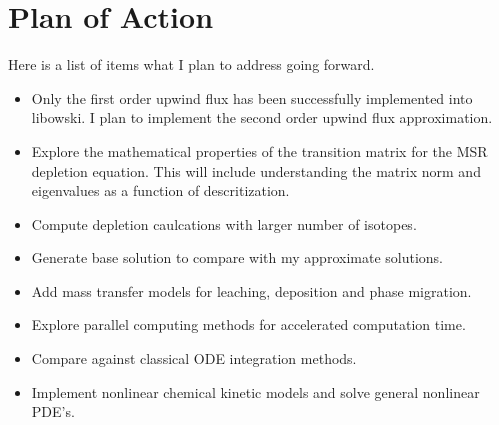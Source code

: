 \chapter{Plan of Action} \label{ch:planOfAction}

Here is a list of items what I plan to address going forward.

\begin{itemize}
    \item Only the first order upwind flux has been successfully implemented into libowski. I plan to implement the second order upwind flux approximation.
    \item Explore the mathematical properties of the transition matrix for the MSR depletion equation. This will include understanding the matrix norm and eigenvalues as a function of descritization. 
    \item Compute depletion caulcations with larger number of isotopes. 
    \item Generate base solution to compare with my approximate solutions.
    \item Add mass transfer models for leaching, deposition and phase migration.
    \item Explore parallel computing methods for accelerated computation time.
    \item Compare against classical ODE integration methods.
    \item Implement nonlinear chemical kinetic models and solve general nonlinear PDE's. 
\end{itemize}
